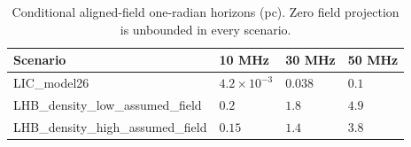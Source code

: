 \begin{table}[htbp]
\centering\small
\caption{Conditional aligned-field one-radian horizons (pc). Zero field projection is unbounded in every scenario.}
\label{tab:horizon}
\begin{tabular}{llll}
\toprule
Scenario & 10 MHz & 30 MHz & 50 MHz\\
\midrule
LIC\_model26 & $4.2\times10^{-3}$ & $0.038$ & $0.1$\\
LHB\_density\_low\_assumed\_field & $0.2$ & $1.8$ & $4.9$\\
LHB\_density\_high\_assumed\_field & $0.15$ & $1.4$ & $3.8$\\
\bottomrule
\end{tabular}
\end{table}
